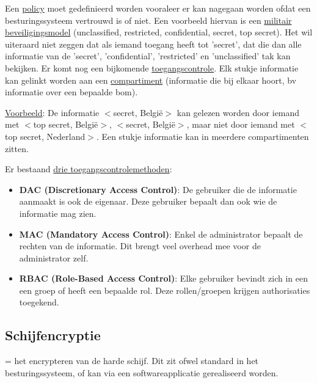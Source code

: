 \documentclass{report}
\begin{document}
	Een \underline{policy} moet gedefinieerd worden vooraleer er kan nagegaan worden ofdat een besturingssysteem vertrouwd is of niet. Een voorbeeld hiervan is een \underline{militair beveiligingsmodel} (unclassified, restricted, confidential, secret, top secret). Het wil uiteraard niet zeggen dat als iemand toegang heeft tot 'secret', dat die dan alle informatie van de 'secret', 'confidential', 'restricted' en 'unclassified' tak kan bekijken. Er komt nog een bijkomende \underline{toegangscontrole}. Elk stukje informatie kan gelinkt worden aan een \underline{compartiment} (informatie die bij elkaar hoort, bv informatie over een bepaalde bom).
	
	\underline{Voorbeeld}: De informatie $<$secret, België$>$ kan gelezen worden door iemand met $<$top secret, België$>$, $<$secret, België$>$, maar niet door iemand met $<$top secret, Nederland$>$. Een stukje informatie kan in meerdere compartimenten zitten.

	Er bestaand \underline{drie toegangscontrolemethoden}:
	\begin{itemize}
		\item \textbf{DAC (Discretionary Access Control)}: De gebruiker die de informatie aanmaakt is ook de eigenaar. Deze gebruiker bepaalt dan ook wie de informatie mag zien. 
		\item \textbf{MAC (Mandatory Access Control)}: Enkel de administrator bepaalt de rechten van de informatie. Dit brengt veel overhead mee voor de administrator zelf.
		\item \textbf{RBAC (Role-Based Access Control)}: Elke gebruiker bevindt zich in een een groep of heeft een bepaalde rol. Deze rollen/groepen krijgen authorisaties toegekend. 
	\end{itemize}


	\subsection{Schijfencryptie}
	= het encrypteren van de harde schijf. Dit zit ofwel standard in het besturingssysteem, of kan via een softwareapplicatie gerealiseerd worden.
\end{document}
